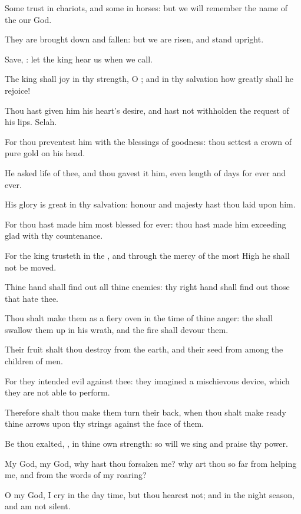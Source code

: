 \Verse Some trust in chariots, and some in horses: but we will remember the name of the \LORD our God.

\Verse They are brought down and fallen: but we are risen, and stand upright.

\Verse Save, \LORD: let the king hear us when we call.




\Chapter
\Verse The king shall joy in thy strength, O \LORD; and in thy salvation how greatly shall he rejoice!

\Verse Thou hast given him his heart's desire, and hast not withholden the request of his lips. Selah.

\Verse For thou preventest him with the blessings of goodness: thou settest a crown of pure gold on his head.

\Verse He asked life of thee, and thou gavest it him, even length of days for ever and ever.

\Verse His glory is great in thy salvation: honour and majesty hast thou laid upon him.

\Verse For thou hast made him most blessed for ever: thou hast made him exceeding glad with thy countenance.

\Verse For the king trusteth in the \LORD, and through the mercy of the most High he shall not be moved.

\Verse Thine hand shall find out all thine enemies: thy right hand shall find out those that hate thee.

\Verse Thou shalt make them as a fiery oven in the time of thine anger: the \LORD shall swallow them up in his wrath, and the fire shall devour them.

\Verse Their fruit shalt thou destroy from the earth, and their seed from among the children of men.

\Verse For they intended evil against thee: they imagined a mischievous device, which they are not able to perform.

\Verse Therefore shalt thou make them turn their back, when thou shalt make ready thine arrows upon thy strings against the face of them.

\Verse Be thou exalted, \LORD, in thine own strength: so will we sing and praise thy power.




\Chapter
\Verse My God, my God, why hast thou forsaken me? why art thou so far from helping me, and from the words of my roaring?

\Verse O my God, I cry in the day time, but thou hearest not; and in the night season, and am not silent.

